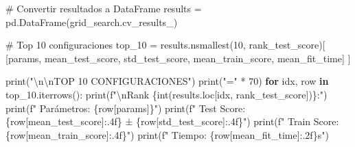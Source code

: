 \documentclass[
  doc,
  floatsintext,
  longtable,
  a4paper,
  nolmodern,
  notxfonts,
  notimes,
  12pt,
  colorlinks=true,linkcolor=blue,citecolor=blue,urlcolor=blue]{apa7}
\newenvironment{Shaded}{\begin{snugshade}}{\end{snugshade}}
\newcommand{\BuiltInTok}[1]{\textcolor[rgb]{0.00,0.23,0.31}{#1}}
\newcommand{\CharTok}[1]{\textcolor[rgb]{0.13,0.47,0.30}{#1}}
\newcommand{\CommentTok}[1]{\textcolor[rgb]{0.37,0.37,0.37}{#1}}
\newcommand{\ControlFlowTok}[1]{\textcolor[rgb]{0.00,0.23,0.31}{\textbf{#1}}}
\newcommand{\DecValTok}[1]{\textcolor[rgb]{0.68,0.00,0.00}{#1}}
\newcommand{\KeywordTok}[1]{\textcolor[rgb]{0.00,0.23,0.31}{\textbf{#1}}}
\newcommand{\NormalTok}[1]{\textcolor[rgb]{0.00,0.23,0.31}{#1}}
\newcommand{\OperatorTok}[1]{\textcolor[rgb]{0.37,0.37,0.37}{#1}}
\newcommand{\SpecialCharTok}[1]{\textcolor[rgb]{0.37,0.37,0.37}{#1}}
\newcommand{\SpecialStringTok}[1]{\textcolor[rgb]{0.13,0.47,0.30}{#1}}
\newcommand{\StringTok}[1]{\textcolor[rgb]{0.13,0.47,0.30}{#1}}
\begin{document}
\begin{Shaded}
\begin{Highlighting}[]
\CommentTok{\# Convertir resultados a DataFrame}
\NormalTok{results }\OperatorTok{=}\NormalTok{ pd.DataFrame(grid\_search.cv\_results\_)}

\CommentTok{\# Top 10 configuraciones}
\NormalTok{top\_10 }\OperatorTok{=}\NormalTok{ results.nsmallest(}\DecValTok{10}\NormalTok{, }\StringTok{\textquotesingle{}rank\_test\_score\textquotesingle{}}\NormalTok{)[}
\NormalTok{    [}\StringTok{\textquotesingle{}params\textquotesingle{}}\NormalTok{, }\StringTok{\textquotesingle{}mean\_test\_score\textquotesingle{}}\NormalTok{, }\StringTok{\textquotesingle{}std\_test\_score\textquotesingle{}}\NormalTok{, }
     \StringTok{\textquotesingle{}mean\_train\_score\textquotesingle{}}\NormalTok{, }\StringTok{\textquotesingle{}mean\_fit\_time\textquotesingle{}}\NormalTok{]}
\NormalTok{]}

\BuiltInTok{print}\NormalTok{(}\StringTok{"}\CharTok{\textbackslash{}n\textbackslash{}n}\StringTok{TOP 10 CONFIGURACIONES"}\NormalTok{)}
\BuiltInTok{print}\NormalTok{(}\StringTok{"="} \OperatorTok{*} \DecValTok{70}\NormalTok{)}
\ControlFlowTok{for}\NormalTok{ idx, row }\KeywordTok{in}\NormalTok{ top\_10.iterrows():}
    \BuiltInTok{print}\NormalTok{(}\SpecialStringTok{f"}\CharTok{\textbackslash{}n}\SpecialStringTok{Rank }\SpecialCharTok{\{}\BuiltInTok{int}\NormalTok{(results.loc[idx, }\StringTok{\textquotesingle{}rank\_test\_score\textquotesingle{}}\NormalTok{])}\SpecialCharTok{\}}\SpecialStringTok{:"}\NormalTok{)}
    \BuiltInTok{print}\NormalTok{(}\SpecialStringTok{f"  Parámetros: }\SpecialCharTok{\{}\NormalTok{row[}\StringTok{\textquotesingle{}params\textquotesingle{}}\NormalTok{]}\SpecialCharTok{\}}\SpecialStringTok{"}\NormalTok{)}
    \BuiltInTok{print}\NormalTok{(}\SpecialStringTok{f"  Test Score: }\SpecialCharTok{\{}\NormalTok{row[}\StringTok{\textquotesingle{}mean\_test\_score\textquotesingle{}}\NormalTok{]}\SpecialCharTok{:.4f\}}\SpecialStringTok{ ± }\SpecialCharTok{\{}\NormalTok{row[}\StringTok{\textquotesingle{}std\_test\_score\textquotesingle{}}\NormalTok{]}\SpecialCharTok{:.4f\}}\SpecialStringTok{"}\NormalTok{)}
    \BuiltInTok{print}\NormalTok{(}\SpecialStringTok{f"  Train Score: }\SpecialCharTok{\{}\NormalTok{row[}\StringTok{\textquotesingle{}mean\_train\_score\textquotesingle{}}\NormalTok{]}\SpecialCharTok{:.4f\}}\SpecialStringTok{"}\NormalTok{)}
    \BuiltInTok{print}\NormalTok{(}\SpecialStringTok{f"  Tiempo: }\SpecialCharTok{\{}\NormalTok{row[}\StringTok{\textquotesingle{}mean\_fit\_time\textquotesingle{}}\NormalTok{]}\SpecialCharTok{:.2f\}}\SpecialStringTok{s"}\NormalTok{)}
\end{Highlighting}
\end{Shaded}
\end{document}
